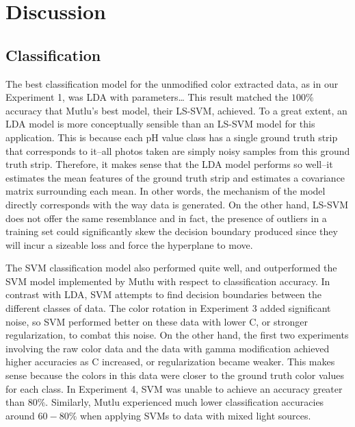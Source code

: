 \documentclass[journal]{IEEEtran}
\begin{document}
\section{Discussion}
\subsection{Classification}
The best classification model for the unmodified color extracted data, as in our Experiment 1, was LDA with parameters… This result matched the $100\%$ accuracy that Mutlu’s best model, their LS-SVM, achieved. To a great extent, an LDA model is more conceptually sensible than an LS-SVM model for this application. This is because each pH value class has a single ground truth strip that corresponds to it--all photos taken are simply noisy samples from this ground truth strip. Therefore, it makes sense that the LDA model performs so well--it estimates the mean features of the ground truth strip and estimates a covariance matrix surrounding each mean. In other words, the mechanism of the model directly corresponds with the way data is generated. On the other hand, LS-SVM does not offer the same resemblance and in fact, the presence of outliers in a training set could significantly skew the decision boundary produced since they will incur a sizeable loss and force the hyperplane to move.

The SVM classification model also performed quite well, and outperformed the SVM model implemented by Mutlu with respect to classification accuracy. In contrast with LDA, SVM attempts to find decision boundaries between the different classes of data. The color rotation in Experiment 3 added significant noise, so SVM performed better on these data with lower C, or stronger regularization, to combat this noise. On the other hand, the first two experiments involving the raw color data and the data with gamma modification achieved higher accuracies as C increased, or regularization became weaker. This makes sense because the colors in this data were closer to the ground truth color values for each class. In Experiment 4, SVM was unable to achieve an accuracy greater than $80\%$. Similarly, Mutlu experienced much lower classification accuracies around $60-80\%$ when applying SVMs to data with mixed light sources.
\end{document}
